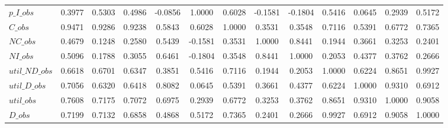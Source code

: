 \begin{center}
\begin{longtable}{lcccccccccccc}
$p\_I\_obs      $	 & 	           0.3977	 & 	           0.5303	 & 	           0.4986	 & 	          -0.0856	 & 	           1.0000	 & 	           0.6028	 & 	          -0.1581	 & 	          -0.1804	 & 	           0.5416	 & 	           0.0645	 & 	           0.2939	 & 	           0.5172 \\ 
$C\_obs         $	 & 	           0.9471	 & 	           0.9286	 & 	           0.9238	 & 	           0.5843	 & 	           0.6028	 & 	           1.0000	 & 	           0.3531	 & 	           0.3548	 & 	           0.7116	 & 	           0.5391	 & 	           0.6772	 & 	           0.7365 \\ 
$NC\_obs        $	 & 	           0.4679	 & 	           0.1248	 & 	           0.2580	 & 	           0.5439	 & 	          -0.1581	 & 	           0.3531	 & 	           1.0000	 & 	           0.8441	 & 	           0.1944	 & 	           0.3661	 & 	           0.3253	 & 	           0.2401 \\ 
$NI\_obs        $	 & 	           0.5096	 & 	           0.1788	 & 	           0.3055	 & 	           0.6461	 & 	          -0.1804	 & 	           0.3548	 & 	           0.8441	 & 	           1.0000	 & 	           0.2053	 & 	           0.4377	 & 	           0.3762	 & 	           0.2666 \\ 
$util\_ND\_obs  $	 & 	           0.6618	 & 	           0.6701	 & 	           0.6347	 & 	           0.3851	 & 	           0.5416	 & 	           0.7116	 & 	           0.1944	 & 	           0.2053	 & 	           1.0000	 & 	           0.6224	 & 	           0.8651	 & 	           0.9927 \\ 
$util\_D\_obs   $	 & 	           0.7056	 & 	           0.6320	 & 	           0.6418	 & 	           0.8082	 & 	           0.0645	 & 	           0.5391	 & 	           0.3661	 & 	           0.4377	 & 	           0.6224	 & 	           1.0000	 & 	           0.9310	 & 	           0.6912 \\ 
$util\_obs      $	 & 	           0.7608	 & 	           0.7175	 & 	           0.7072	 & 	           0.6975	 & 	           0.2939	 & 	           0.6772	 & 	           0.3253	 & 	           0.3762	 & 	           0.8651	 & 	           0.9310	 & 	           1.0000	 & 	           0.9058 \\ 
$D\_obs         $	 & 	           0.7199	 & 	           0.7132	 & 	           0.6858	 & 	           0.4868	 & 	           0.5172	 & 	           0.7365	 & 	           0.2401	 & 	           0.2666	 & 	           0.9927	 & 	           0.6912	 & 	           0.9058	 & 	           1.0000 \\ 
\end{longtable}
 \end{center}

